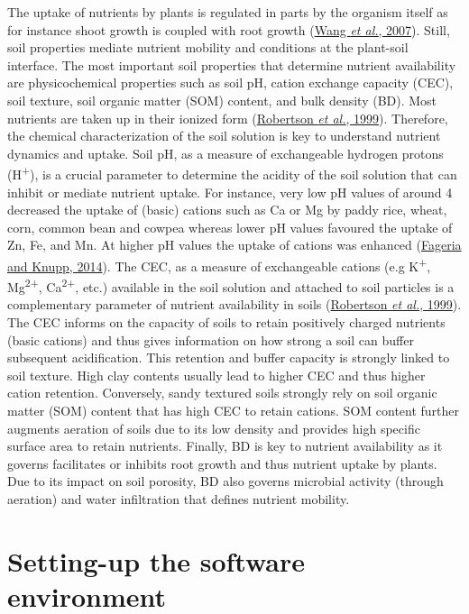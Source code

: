 \documentclass[
  10pt,
  b5paper,
  oneside]{book}
\begin{document}
The uptake of nutrients by plants is regulated in parts by the organism itself as for instance shoot growth is coupled with root growth (\protect\hyperlink{ref-wang2007}{Wang \emph{et al.}, 2007}). Still, soil properties mediate nutrient mobility and conditions at the plant-soil interface. The most important soil properties that determine nutrient availability are physicochemical properties such as soil pH, cation exchange capacity (CEC), soil texture, soil organic matter (SOM) content, and bulk density (BD).
Most nutrients are taken up in their ionized form (\protect\hyperlink{ref-robertson1999}{Robertson \emph{et al.}, 1999}). Therefore, the chemical characterization of the soil solution is key to understand nutrient dynamics and uptake.
Soil pH, as a measure of exchangeable hydrogen protons (H\textsuperscript{+}), is a crucial parameter to determine the acidity of the soil solution that can inhibit or mediate nutrient uptake. For instance, very low pH values of around 4 decreased the uptake of (basic) cations such as Ca or Mg by paddy rice, wheat, corn, common bean and cowpea whereas lower pH values favoured the uptake of Zn, Fe, and Mn. At higher pH values the uptake of cations was enhanced (\protect\hyperlink{ref-fageria2014}{Fageria and Knupp, 2014}).
The CEC, as a measure of exchangeable cations (e.g K\textsuperscript{+}, Mg\textsuperscript{2+}, Ca\textsuperscript{2+}, etc.) available in the soil solution and attached to soil particles is a complementary parameter of nutrient availability in soils (\protect\hyperlink{ref-robertson1999}{Robertson \emph{et al.}, 1999}). The CEC informs on the capacity of soils to retain positively charged nutrients (basic cations) and thus gives information on how strong a soil can buffer subsequent acidification. This retention and buffer capacity is strongly linked to soil texture. High clay contents usually lead to higher CEC and thus higher cation retention. Conversely, sandy textured soils strongly rely on soil organic matter (SOM) content that has high CEC to retain cations.
SOM content further augments aeration of soils due to its low density and provides high specific surface area to retain nutrients.
Finally, BD is key to nutrient availability as it governs facilitates or inhibits root growth and thus nutrient uptake by plants. Due to its impact on soil porosity, BD also governs microbial activity (through aeration) and water infiltration that defines nutrient mobility.

\hypertarget{setting-up-the-software-environment}{%
\chapter{Setting-up the software environment}\label{setting-up-the-software-environment}}
\end{document}
